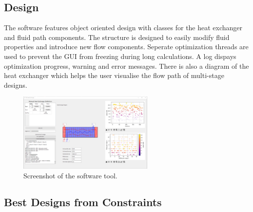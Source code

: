 \documentclass{article}
\begin{document}
\subsection{Design}
The software features object oriented design with classes for the heat exchanger and fluid path components.
The structure is designed to easily modify fluid properties and introduce new flow components.
Seperate optimization threads are used to prevent the GUI from freezing during long calculations.
A log dispays optimization progress, warning and error messages. There is also a diagram of the heat exchanger which helps
the user visualise the flow path of multi-stage designs.

\begin{figure}[H]
  \centering
  \includegraphics[width=0.6\textwidth]{software.png}
  \caption{Screenshot of the software tool.}
  \label{fig:software}
\end{figure}

\subsection{Best Designs from Constraints}
\end{document}
